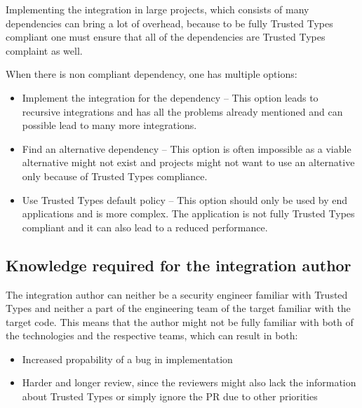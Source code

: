 Implementing the integration in large projects, which consists of many dependencies can bring a lot
of overhead, because to be fully Trusted Types compliant one must ensure that all of the
dependencies are Trusted Types complaint as well.

When there is non compliant dependency, one has multiple options:

\begin{itemize}
  \item Implement the integration for the dependency -- This option leads to recursive integrations
        and has all the problems already mentioned and can possible lead to many more integrations.
  \item Find an alternative dependency -- This option is often impossible as a viable alternative
        might not exist and projects might not want to use an alternative only because of Trusted
        Types compliance.
  \item Use Trusted Types default policy -- This option should only be used by end applications and
        is more complex. The application is not fully Trusted Types compliant and it can also lead
        to a reduced performance.
\end{itemize}

\subsection{Knowledge required for the integration author}
\label{sub:trust_integration_author}

The integration author can neither be a security engineer familiar with Trusted Types and neither a
part of the engineering team of the target familiar with the target code. This means that the author
might not be fully familiar with both of the technologies and the respective teams, which can result
in both:

\begin{itemize}
  \item Increased propability of a bug in implementation
  \item Harder and longer review, since the reviewers might also lack the information about Trusted
        Types or simply ignore the PR due to other priorities
\end{itemize}
